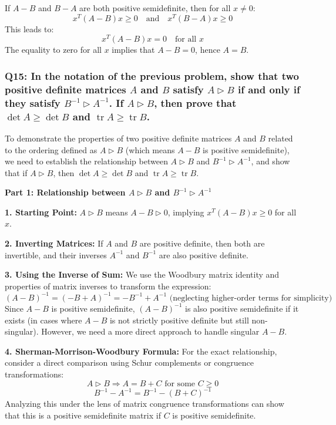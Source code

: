 \documentclass[8pt]{article}
\begin{document}
{{If \(A - B\) and \(B - A\) are both positive semidefinite, then for all \(x \neq 0\):
\[
x^T (A - B) x \geq 0 \quad \text{and} \quad x^T (B - A) x \geq 0
\]
This leads to:
\[
x^T (A - B) x = 0 \quad \text{for all } x
\]
The equality to zero for all \(x\) implies that \(A - B = 0\), hence \(A = B\).

\subsubsection*{Q15: In the notation of the previous problem, show that two positive definite matrices \(A\) and \(B\) satisfy \(A \triangleright B\) if and only if they satisfy \(B^{-1} \triangleright A^{-1}\). If \(A \triangleright B\), then prove that \(\det A \geq \det B\) and \(\operatorname{tr} A \geq \operatorname{tr} B\).}

To demonstrate the properties of two positive definite matrices \(A\) and \(B\) related to the ordering defined as \(A \triangleright B\) (which means \(A - B\) is positive semidefinite), we need to establish the relationship between \(A \triangleright B\) and \(B^{-1} \triangleright A^{-1}\), and show that if \(A \triangleright B\), then \(\det A \geq \det B\) and \(\operatorname{tr} A \geq \operatorname{tr} B\).

\textbf{Part 1: Relationship between \(A \triangleright B\) and \(B^{-1} \triangleright A^{-1}\)}

\textbf{1. Starting Point:}
   \(A \triangleright B\) means \(A - B \triangleright 0\), implying \(x^T (A - B) x \geq 0\) for all \(x\).

\textbf{2. Inverting Matrices:}
   If \(A\) and \(B\) are positive definite, then both are invertible, and their inverses \(A^{-1}\) and \(B^{-1}\) are also positive definite.

\textbf{3. Using the Inverse of Sum:}
   We use the Woodbury matrix identity and properties of matrix inverses to transform the expression:
   \[
   (A - B)^{-1} = (-B + A)^{-1} = -B^{-1} + A^{-1} \text{ (neglecting higher-order terms for simplicity)}
   \]
   Since \(A - B\) is positive semidefinite, \((A - B)^{-1}\) is also positive semidefinite if it exists (in cases where \(A - B\) is not strictly positive definite but still non-singular). However, we need a more direct approach to handle singular \(A-B\).

\textbf{4. Sherman-Morrison-Woodbury Formula:}
   For the exact relationship, consider a direct comparison using Schur complements or congruence transformations:
   \[
   A \triangleright B \Rightarrow A = B + C \text{ for some } C \geq 0
   \]
   \[
   B^{-1} - A^{-1} = B^{-1} - (B + C)^{-1}
   \]
   Analyzing this under the lens of matrix congruence transformations can show that this is a positive semidefinite matrix if \(C\) is positive semidefinite.

}}
\end{document}
